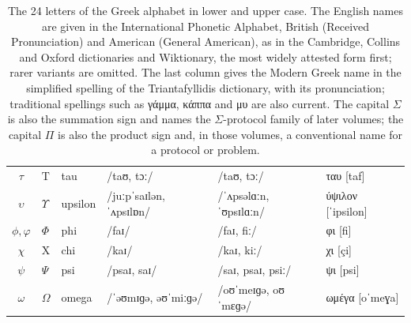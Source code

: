 \documentclass[11pt,a4paper]{article}
\theoremstyle{definition}
\theoremstyle{remark}
\providecommand{\ipa}[1]{#1}
\begin{document}
\begin{table}[htp]
\begin{tabular}{@{}clllll@{}}
\(\tau\) & \(\mathrm{T}\) & tau & \ipa{/taʊ, tɔː/} & \ipa{/taʊ, tɔː/} & \ipa{ταυ [taf]} \\
\(\upsilon\) & \(\Upsilon\) & upsilon & \ipa{/juːpˈsaɪlən, ˈʌpsɪlɒn/} & \ipa{/ˈʌpsəlɑːn, ˈʊpsɪlɑːn/} & \ipa{ύψιλον [ˈipsilon]} \\
\(\phi,\varphi\) & \(\Phi\) & phi & \ipa{/faɪ/} & \ipa{/faɪ, fiː/} & \ipa{φι [fi]} \\
\(\chi\) & \(\mathrm{X}\) & chi & \ipa{/kaɪ/} & \ipa{/kaɪ, kiː/} & \ipa{χι [çi]} \\
\(\psi\) & \(\Psi\) & psi & \ipa{/psaɪ, saɪ/} & \ipa{/saɪ, psaɪ, psiː/} & \ipa{ψι [psi]} \\
\(\omega\) & \(\Omega\) & omega & \ipa{/ˈəʊmɪɡə, əʊˈmiːɡə/} & \ipa{/oʊˈmeɪɡə, oʊˈmɛɡə/} & \ipa{ωμέγα [oˈmeɣa]} \\
\bottomrule
\end{tabular}
\caption{The 24 letters of the Greek alphabet in lower and upper case. The
English names are given in the International Phonetic Alphabet, British (Received
Pronunciation) and American (General American), as in the Cambridge, Collins and
Oxford dictionaries and Wiktionary, the most widely attested form first; rarer
variants are omitted. The last column gives the Modern
Greek name in the simplified spelling of the Triantafyllidis dictionary, with
its pronunciation; traditional spellings such as \ipa{γάμμα}, \ipa{κάππα} and
\ipa{μυ} are also current. The capital \(\Sigma\) is also the summation sign and
names the \(\Sigma\)-protocol family of later volumes; the capital \(\Pi\) is also
the product sign and, in those volumes, a conventional name for a protocol or
problem.}
\label{tab:notation-greek}
\end{table}
\end{document}
